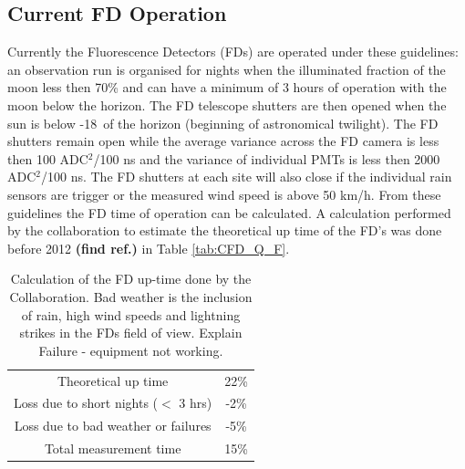 \subsection{Current FD Operation}
Currently the Fluorescence Detectors (FDs) are operated under these guidelines: an observation run is organised for nights when the illuminated fraction of the moon less then 70\% and can have a minimum of 3 hours of operation with the moon below the horizon. The FD telescope shutters are then opened when the sun is below -18\textdegree \ of the horizon (beginning of astronomical twilight). The FD shutters remain open while the average variance across the FD camera is less then 100 ADC$^2$/100 ns and the variance of individual PMTs is less then 2000 ADC$^2$/100 ns. The FD shutters at each site will also close if the individual rain sensors are trigger or the measured wind speed is above 50 km/h.  From these guidelines the FD time of operation can be calculated. A calculation performed by the collaboration to estimate the theoretical up time of the FD's was done before 2012 \textbf{(find ref.)} in Table \ref{tab:CFD_Q_F}.
\begin{table}[h]
\centering
\begin{tabular}{c c}
\hline\hline
Theoretical up time & 22\% \\
Loss due to short nights ($<$ 3 hrs) & -2\% \\
Loss due to bad weather or failures & -5\% \\ \hline \hline
Total measurement time & 15\% \\
\hline\hline
\end{tabular}
\caption{Calculation of the FD up-time done by the Collaboration. Bad weather is the inclusion of rain, high wind speeds and lightning strikes in the FDs field of view. Explain Failure - equipment not working.} \label{tab:FD_uptime}
\end{table}
